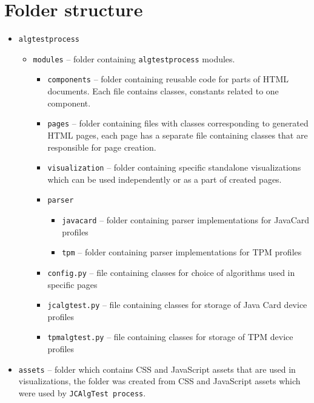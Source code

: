 \section{Folder structure}
\begin{itemize}
    \item \texttt{algtestprocess}
        \begin{itemize}
            \item \texttt{modules} -- folder containing \texttt{algtestprocess} modules.
                \begin{itemize}
                    \item \texttt{components} -- folder containing reusable code for parts of HTML documents. Each file contains classes, constants related to one component.
                    \item \texttt{pages} -- folder containing files with classes corresponding to generated HTML pages, each page has a separate file containing classes that are responsible for page creation.
                    \item \texttt{visualization} -- folder containing specific standalone visualizations which can be used independently or as a part of created pages.
                    \item \texttt{parser}
                        \begin{itemize}
                            \item \texttt{javacard} -- folder containing parser implementations for JavaCard profiles
                            \item \texttt{tpm} -- folder containing parser implementations for TPM profiles
                        \end{itemize}
                    \item \texttt{config.py} -- file containing classes for choice of algorithms used in specific pages
                    \item \texttt{jcalgtest.py} -- file containing classes for storage of Java Card device profiles
                    \item \texttt{tpmalgtest.py} -- file containing classes for storage of TPM device profiles
                \end{itemize}
        \end{itemize}
    \item \texttt{assets} -- folder which contains CSS and JavaScript assets that are used in visualizations, the folder was created from CSS and JavaScript assets which were used by \texttt{JCAlgTest process}.

\end{itemize}
